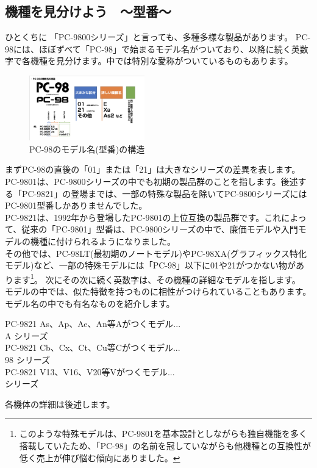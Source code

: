 \documentclass[b5paper,9pt,platex,dvipdfmx]{jsarticle}
\begin{document}
\begin{multicols*}{3}
\section[short]{機種を見分けよう　〜型番〜}
ひとくちに 「PC-9800シリーズ」と言っても、多種多様な製品があります。
PC-98には、ほぼずべて「PC-98」で始まるモデル名がついており、以降に続く英数字で各機種を見分けます。中では特別な愛称がついているものもあります。
\begin{figure}[H]
  \centering
  \includegraphics[width=5cm]{img-2.png}
  \caption{PC-98のモデル名(型番)の構造}
\end{figure}
まずPC-98の直後の「01」または「21」は大きなシリーズの差異を表します。\\
PC-9801は、PC-9800シリーズの中でも初期の製品群のことを指します。後述する「PC-9821」の登場までは、一部の特殊な製品を除いてPC-9800シリーズにはPC-9801型番しかありませんでした。\\
PC-9821は、1992年から登場したPC-9801の上位互換の製品群です。これによって、従来の「PC-9801」型番は、PC-9800シリーズの中で、廉価モデルや入門モデルの機種に付けられるようになりました。\\
その他では、PC-98LT(最初期のノートモデル)やPC-98XA(グラフィックス特化モデル)など、一部の特殊モデルには「PC-98」以下に01や21がつかない物があります\footnote{このような特殊モデルは、PC-9801を基本設計としながらも独自機能を多く搭載していたため、「PC-98」の名前を冠していながらも他機種との互換性が低く売上が伸び悩む傾向にありました。}。
次にその次に続く英数字は、その機種の詳細なモデルを指します。\\
モデルの中では、似た特徴を持つものに相性がつけられていることもあります。\\
モデル名の中でも有名なものを紹介します。\\
\begin{screen}
  PC-9821 As、Ap、Ae、An等Aがつくモデル...\\
   A シリーズ\\
  PC-9821 Cb、Cx、Ct、Cu等Cがつくモデル...\\
  98  シリーズ\\
  PC-9821 V13、V16、V20等Vがつくモデル...\\
   シリーズ
  \end{screen}
  各機体の詳細は後述します。

\end{multicols*}
\end{document}
